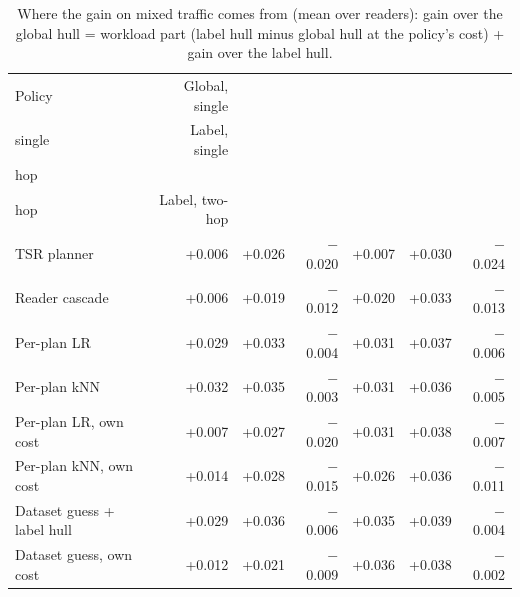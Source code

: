 \begin{table}[t]
\centering\small
\setlength{\tabcolsep}{4pt}
\caption{Where the gain on mixed traffic comes from (mean over readers): gain over the global hull = workload part (label hull minus global hull at the policy's cost) + gain over the label hull.}
\label{tab:rev2_decomp}
\begin{tabular*}{\linewidth}{@{\extracolsep{\fill}}lrrrrrr}
\toprule
Policy & Global, single & \begin{tabular}[b]{@{}r@{}}Workload, \\ single\end{tabular} & Label, single & \begin{tabular}[b]{@{}r@{}}Global, two \\ hop\end{tabular} & \begin{tabular}[b]{@{}r@{}}Workload, two \\ hop\end{tabular} & Label, two-hop \\
\midrule
TSR planner & +0.006 & +0.026 & $-$0.020 & +0.007 & +0.030 & $-$0.024 \\
Reader cascade & +0.006 & +0.019 & $-$0.012 & +0.020 & +0.033 & $-$0.013 \\
Per-plan LR & +0.029 & +0.033 & $-$0.004 & +0.031 & +0.037 & $-$0.006 \\
Per-plan kNN & +0.032 & +0.035 & $-$0.003 & +0.031 & +0.036 & $-$0.005 \\
Per-plan LR, own cost & +0.007 & +0.027 & $-$0.020 & +0.031 & +0.038 & $-$0.007 \\
Per-plan kNN, own cost & +0.014 & +0.028 & $-$0.015 & +0.026 & +0.036 & $-$0.011 \\
Dataset guess + label hull & +0.029 & +0.036 & $-$0.006 & +0.035 & +0.039 & $-$0.004 \\
Dataset guess, own cost & +0.012 & +0.021 & $-$0.009 & +0.036 & +0.038 & $-$0.002 \\
\bottomrule
\end{tabular*}
\end{table}
